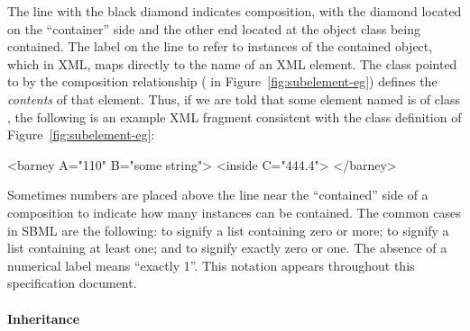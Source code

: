 The line with the black diamond indicates composition,
with the diamond located on the ``container'' side and the other
end located at the object class being contained.  The label on the
line  to refer to instances of the contained
object, which in XML, maps directly to the name of an XML element.
The class pointed to by the composition relationship (
in Figure~\ref{fig:subelement-eg}) defines the \emph{contents} of
that element.  Thus, if we are told that some element named
 is of class , the following is an
example XML fragment consistent with the class definition of
Figure~\ref{fig:subelement-eg}:

\begin{example}
<barney A="110" B="some string">
    <inside C="444.4">
</barney>
\end{example}

Sometimes numbers are placed above the line near the ``contained''
side of a composition to indicate how many instances can be
contained.  The common cases in SBML are the following:
\token{[0..*]} to signify a list containing zero or more;
\token{[1..*]} to signify a list containing at least one; and
\token{[0..1]} to signify exactly zero or one.  The absence of a
numerical label means ``exactly 1''.  This notation appears
throughout this specification document.


\clearpage

\paragraph{Inheritance}

